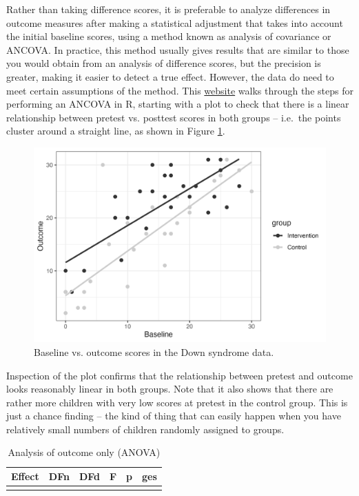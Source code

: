 \documentclass{krantz}
\begin{document}
Rather than taking difference scores, it is preferable to analyze differences in outcome measures after making a statistical adjustment that takes into account the initial baseline scores, using a method known as analysis of covariance or ANCOVA. In practice, this method usually gives results that are similar to those you would obtain from an analysis of difference scores, but the precision is greater, making it easier to detect a true effect. However, the data do need to meet certain assumptions of the method. This \href{https://www.datanovia.com/en/lessons/ancova-in-r/}{website} walks through the steps for performing an ANCOVA in R, starting with a plot to check that there is a linear relationship between pretest vs. posttest scores in both groups -- i.e.~the points cluster around a straight line, as shown in Figure \ref{fig:ds-prepost}.

\begin{figure}
\includegraphics[width=0.8\linewidth]{images_bw/ds-prepost} \caption{Baseline vs. outcome scores in the Down syndrome data.}\label{fig:ds-prepost}
\end{figure}

Inspection of the plot confirms that the relationship between pretest and outcome looks reasonably linear in both groups. Note that it also shows that there are rather more children with very low scores at pretest in the control group. This is just a chance finding -- the kind of thing that can easily happen when you have relatively small numbers of children randomly assigned to groups.

\begin{table}

\caption{\label{tab:ancova-compare}Analysis of outcome only (ANOVA)}
\centering
\begin{tabular}[t]{>{}cccccc}
\toprule
Effect & DFn & DFd & F & p & ges\\
\midrule
\textbf{\cellcolor{gray!6}{group}} & \cellcolor{gray!6}{1} & \cellcolor{gray!6}{52} & \cellcolor{gray!6}{6.773} & \cellcolor{gray!6}{0.012} & \cellcolor{gray!6}{0.115}\\
\bottomrule
\end{tabular}
\end{table}
\end{document}
